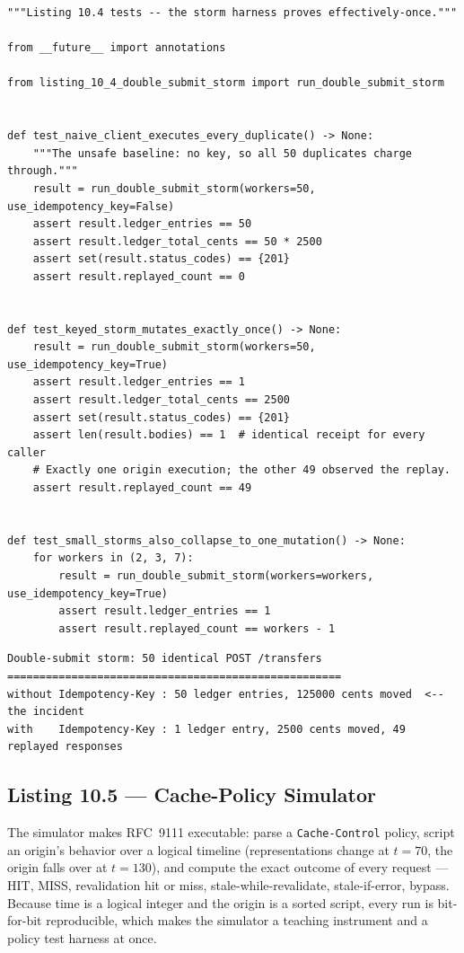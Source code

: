 \begin{verbatim}
"""Listing 10.4 tests -- the storm harness proves effectively-once."""

from __future__ import annotations

from listing_10_4_double_submit_storm import run_double_submit_storm


def test_naive_client_executes_every_duplicate() -> None:
    """The unsafe baseline: no key, so all 50 duplicates charge through."""
    result = run_double_submit_storm(workers=50, use_idempotency_key=False)
    assert result.ledger_entries == 50
    assert result.ledger_total_cents == 50 * 2500
    assert set(result.status_codes) == {201}
    assert result.replayed_count == 0


def test_keyed_storm_mutates_exactly_once() -> None:
    result = run_double_submit_storm(workers=50, use_idempotency_key=True)
    assert result.ledger_entries == 1
    assert result.ledger_total_cents == 2500
    assert set(result.status_codes) == {201}
    assert len(result.bodies) == 1  # identical receipt for every caller
    # Exactly one origin execution; the other 49 observed the replay.
    assert result.replayed_count == 49


def test_small_storms_also_collapse_to_one_mutation() -> None:
    for workers in (2, 3, 7):
        result = run_double_submit_storm(workers=workers, use_idempotency_key=True)
        assert result.ledger_entries == 1
        assert result.replayed_count == workers - 1
\end{verbatim}

\begin{verbatim}
Double-submit storm: 50 identical POST /transfers
====================================================
without Idempotency-Key : 50 ledger entries, 125000 cents moved  <-- the incident
with    Idempotency-Key : 1 ledger entry, 2500 cents moved, 49 replayed responses
\end{verbatim}

\subsection{Listing 10.5 --- Cache-Policy Simulator}
\label{sec:ch10-listing5}

The simulator makes RFC~9111 executable: parse a \texttt{Cache-Control}
policy, script an origin's behavior over a logical timeline (representations
change at $t=70$, the origin falls over at $t=130$), and compute the exact
outcome of every request --- HIT, MISS, revalidation hit or miss,
stale-while-revalidate, stale-if-error, bypass. Because time is a logical
integer and the origin is a sorted script, every run is bit-for-bit
reproducible, which makes the simulator a teaching instrument and a policy
test harness at once.


